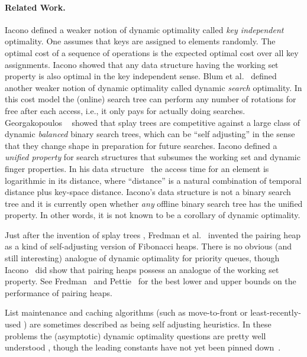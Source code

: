 \documentclass{article}
\begin{document}
\paragraph{Related Work.}
Iacono \cite{Iacono05} defined a weaker notion of dynamic optimality called {\em key independent} optimality.
One assumes that keys are assigned to elements randomly.  The optimal cost of a sequence of operations
is the expected optimal cost over all key assignments.  Iacono showed that any data structure having the
working set property is also optimal in the key independent sense.  
Blum et al.~\cite{BCK03} defined another weaker notion of dynamic optimality called dynamic {\em search} optimality.
In this cost model the (online) search tree can perform any number of rotations for free after each access, i.e.,
it only pays for actually doing searches.
Georgakopoulos ~\cite{Georg04}
showed that splay trees are competitive against a large class of dynamic {\em balanced} binary search trees,
which can be ``self adjusting'' in the sense that they change shape in preparation for future searches.
Iacono defined a {\em unified property} for search structures that subsumes the working set and dynamic finger
properties.  In his data structure~\cite{Iacono01} the access time for an element is logarithmic in its distance, 
where ``distance'' is a natural combination of temporal distance plus key-space distance.  Iacono's data structure \cite{Iacono01}
is not a binary search tree and it is currently open whether {\em any} offline binary search tree has the unified property.
In other words, it is not known to be a corollary of dynamic optimality.

Just after the invention of splay trees \cite{ST85}, Fredman et al.~\cite{F+86} invented the pairing heap
as a kind of self-adjusting version of Fibonacci heaps.  There is no obvious (and still interesting) analogue of dynamic optimality
for priority queues, though Iacono~\cite{Iac00} did show that pairing heaps possess an analogue of the working set property.
See Fredman~\cite{F99} and Pettie~\cite{Pet05a} for the best lower and upper bounds on the performance of pairing heaps.

List maintenance and caching algorithms (such as move-to-front or least-recently-used \cite{ST85b}) 
are sometimes described as being self adjusting heuristics.  In these problems the (asymptotic) dynamic optimality
questions are pretty well understood \cite{ST85b}, though the leading constants have not yet been pinned down~\cite{Albers98,ASW95}.
\end{document}
